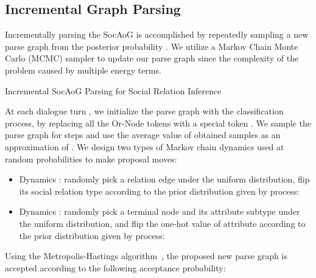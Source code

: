 \documentclass[11pt,a4paper]{article}
\begin{document}
\subsection{Incremental Graph Parsing}
Incrementally parsing the SocAoG is accomplished by repeatedly sampling a new parse graph  from the posterior probability . We utilize a Markov Chain Monte Carlo (MCMC) sampler to update our parse graph since the complexity of the problem caused by multiple energy terms. 
\begin{algorithm}[t]
\caption{Incremental SocAoG Parsing for Social Relation Inference}
\label{alg:parsing}
\small
{}
\end{algorithm}

At each dialogue turn , we initialize the parse graph with the  classification process, by replacing all the Or-Node tokens with a special token . We sample the parse graph for  steps and use the average value of obtained samples as an approximation of . We design two types of Markov chain dynamics used at random probabilities  to make proposal moves:
\begin{itemize}
\item Dynamics : randomly pick a relation edge  under the uniform distribution, flip its social relation type  according to the prior distribution given by  process:
 
\item Dynamics : randomly pick a terminal node  and its attribute subtype under the uniform distribution, and flip the one-hot value of attribute  according to the prior distribution given by  process: 
 
\end{itemize}
Using the Metropolis-Hastings algorithm~\citep{chib1995understanding}, the proposed new parse graph  is accepted according to the following acceptance probability:
\end{document}
